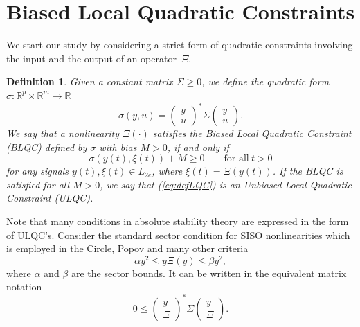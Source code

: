\documentclass[letterpaper,10pt,conference,twocolumn]{IEEEtran}
\newtheorem{dfn}{Definition}
\newtheorem{obs}{Observation}
\newcommand{\Csi}{\Xi}
\newcommand{\Real}{\mathbb{R}}
\begin{document}
\section{Biased Local Quadratic Constraints}\label{sec:BLQC}
We start our study by considering a strict form of quadratic constraints involving the input and the output of an operator~$\Csi$.
\begin{dfn}
	Given a constant matrix $\Sigma\geq 0$, we define the quadratic form $\sigma: \Real^{p} \times \Real^{m} \rightarrow \Real$
		\begin{equation}\nonumber
			\sigma(y,u)=
					\left(\begin{array}{c}
						y\\
						u
					\end{array}\right)^*
					\Sigma
					\left(\begin{array}{c}
						y\\
						u
					\end{array}\right).
		\end{equation}
	We say that a nonlinearity $\Xi(\cdot)$ satisfies the Biased Local Quadratic Constraint (BLQC) defined by $\sigma$ with bias $M>0$, if and only if
	\begin{equation}\label{eq:defLQC}
		\sigma(y(t),\xi(t)) + M\geq 0 \qquad \text{for all}~t>0
	\end{equation}
	for any signals $y(t),\xi(t)\in L_{2e}$, where $\xi(t)=\Xi(y(t))$.
	If the BLQC is satisfied for all $M>0$, we say that (\ref{eq:defLQC}) is an Unbiased Local Quadratic Constraint (ULQC).
\end{dfn}
\noindent
	Note that many conditions in absolute stability theory are expressed in the form of ULQC's. Consider the standard sector condition for SISO nonlinearities which is employed in the Circle, Popov and many other criteria
	\begin{equation*}
		\alpha y^2 \leq y \Xi(y) \leq \beta y^2,
	\end{equation*}
	where $\alpha$ and $\beta$ are the sector bounds. It can be written in the equivalent matrix notation
	\begin{equation}\nonumber
		0\leq 
		\left(\begin{array}{c}
			y\\
			\Xi
		\end{array}\right)^*
		\Sigma
		\left(\begin{array}{c}
			y\\
			\Xi
		\end{array}\right).
	\end{equation}
\end{document}

